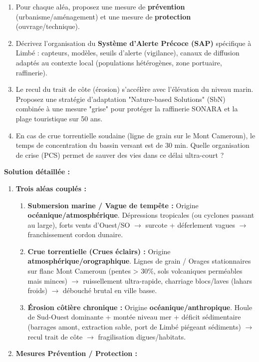 \documentclass[11pt]{article}
\begin{document}
\begin{exoresolu}
\begin{enumerate}
    \item Pour chaque aléa, proposez une mesure de \textbf{prévention} (urbanisme/aménagement) et une mesure de \textbf{protection} (ouvrage/technique).
    \item Décrivez l'organisation du \textbf{Système d'Alerte Précoce (SAP)} spécifique à Limbé : capteurs, modèles, seuils d'alerte (vigilance), canaux de diffusion adaptés au contexte local (populations hétérogènes, zone portuaire, raffinerie).
    \item Le recul du trait de côte (érosion) s'accélère avec l'élévation du niveau marin. Proposez une stratégie d'adaptation "Nature-based Solutions" (SbN) combinée à une mesure "grise" pour protéger la raffinerie SONARA et la plage touristique sur 50 ans.
    \item En cas de crue torrentielle soudaine (ligne de grain sur le Mont Cameroun), le temps de concentration du bassin versant est de 30 min. Quelle organisation de crise (PCS) permet de sauver des vies dans ce délai ultra-court ?
\end{enumerate}
\tcblower
\textbf{Solution détaillée :}
\begin{enumerate}
    \item \textbf{Trois aléas couplés :}
          \begin{enumerate}
              \item \textbf{Submersion marine / Vague de tempête :} Origine \textbf{océanique/atmosphérique}. Dépressions tropicales (ou cyclones passant au large), forts vents d'Ouest/SO $\rightarrow$ surcote + déferlement vagues $\rightarrow$ franchissement cordon dunaire.
              \item \textbf{Crue torrentielle (Crues éclairs) :} Origine \textbf{atmosphérique/orographique}. Lignes de grain / Orages stationnaires sur flanc Mont Cameroun (pentes > 30\%, sols volcaniques perméables mais minces) $\rightarrow$ ruissellement ultra-rapide, charriage blocs/laves (lahars froids) $\rightarrow$ débouché brutal en ville basse.
              \item \textbf{Érosion côtière chronique :} Origine \textbf{océanique/anthropique}. Houle de Sud-Ouest dominante + montée niveau mer + déficit sédimentaire (barrages amont, extraction sable, port de Limbé piégeant sédiments) $\rightarrow$ recul trait de côte $\rightarrow$ fragilisation digues/habitats.
          \end{enumerate}
    \item \textbf{Mesures Prévention / Protection :}
          \begin{center}

\end{center}
\end{enumerate}
\end{exoresolu}
\end{document}
